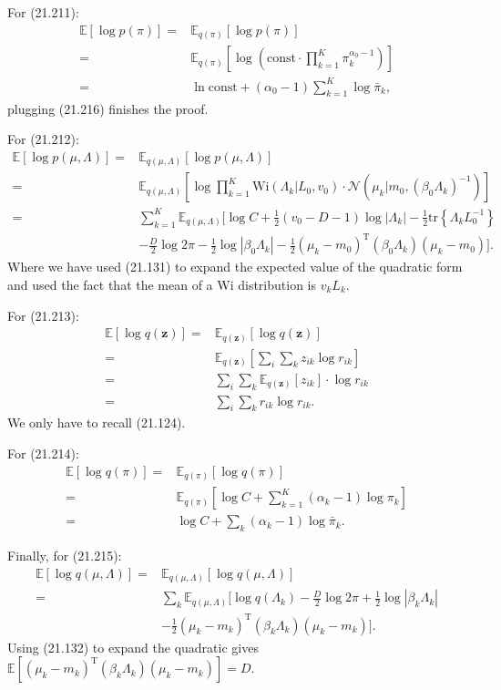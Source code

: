 \documentclass[UTF8]{ctexart}
\begin{document}
For (21.211):
$$
\begin{aligned}
\mathbb{E}[\log p(\pi)]=&\mathbb{E}_{q(\pi)}[\log p(\pi)] \\
=&\mathbb{E}_{q(\pi)}[\log (\text{const}\cdot \prod_{k=1}^{K}\pi_{k}^{\alpha_{0}-1})] \\
=&\ln \text{const} + (\alpha_{0}-1)\sum_{k=1}^{K}\log \bar{\pi}_{k}, 
\end{aligned}
$$
plugging (21.216) finishes the proof.

For (21.212):
$$
\begin{aligned}
\mathbb{E}[\log p(\mu,\Lambda)]=&\mathbb{E}_{q(\mu,\Lambda)}[\log p(\mu,\Lambda)]  \\
=&\mathbb{E}_{q(\mu,\Lambda)}\left[\log \prod_{k=1}^{K}\text{Wi}(\Lambda_{k}|L_{0},v_{0})\cdot \mathcal{N}(\mu_{k}|m_{0},(\beta_{0}\Lambda_{k})^{-1})\right] \\
=&\sum_{k=1}^{K}\mathbb{E}_{q(\mu,\Lambda)}[ \log C + \frac{1}{2}(v_{0}-D-1)\log |\Lambda_{k}| -\frac{1}{2}\text{tr}\left\{ \Lambda_{k}L_{0}^{-1} \right\} \\
\ & - \frac{D}{2}\log 2 \pi - \frac{1}{2}\log |\beta_{0}\Lambda_{k}| -\frac{1}{2}(\mu_{k}-m_{0})^{\text{T}}(\beta_{0}\Lambda_{k})(\mu_{k}-m_{0}) ].
\end{aligned}
$$
Where we have used (21.131) to expand the expected value of the quadratic form and used the fact that the mean of a Wi distribution is $v_{k}L_{k}$.

For (21.213):
$$
\begin{aligned}
\mathbb{E}[\log q(\textbf{z})]=& \mathbb{E}_{q(\textbf{z})}[\log q(\textbf{z})]  \\
=&\mathbb{E}_{q(\textbf{z})}[\sum_{i}\sum_{k}z_{ik}\log r_{ik}] \\
=&\sum_{i}\sum_{k} \mathbb{E}_{q(\textbf{z})}[z_{ik}]\cdot\log r_{ik} \\
=& \sum_{i}\sum_{k} r_{ik}\log r_{ik}.
\end{aligned}
$$
We only have to recall (21.124). 

For (21.214):
$$
\begin{aligned}
\mathbb{E}[\log q(\pi)]=&\mathbb{E}_{q(\pi)}[\log q(\pi)]  \\
=&\mathbb{E}_{q(\pi)}[\log C + \sum_{k=1}^{K}(\alpha_{k}-1)\log \pi_{k}]  \\
=&\log C + \sum_{k}(\alpha_{k}-1)\log \bar{\pi}_{k}. 
\end{aligned}
$$

Finally, for (21.215):
$$
\begin{aligned}
\mathbb{E}[\log q(\mu,\Lambda)]=& \mathbb{E}_{q(\mu,\Lambda)}[\log q(\mu,\Lambda)]  \\
=&\sum_{k}\mathbb{E}_{q(\mu,\Lambda)}[\log q(\Lambda_{k})-\frac{D}{2}\log 2\pi +\frac{1}{2}\log |\beta_{k}\Lambda_{k}| \\
\ &-\frac{1}{2}(\mu_{k}-m_{k})^{\text{T}}(\beta_{k}\Lambda_{k})(\mu_{k}-m_{k})  ].
\end{aligned}
$$
Using (21.132) to expand the quadratic gives $\mathbb{E}[(\mu_{k}-m_{k})^{\text{T}}(\beta_{k}\Lambda_{k})(\mu_{k}-m_{k})]=D$.
\end{document}
